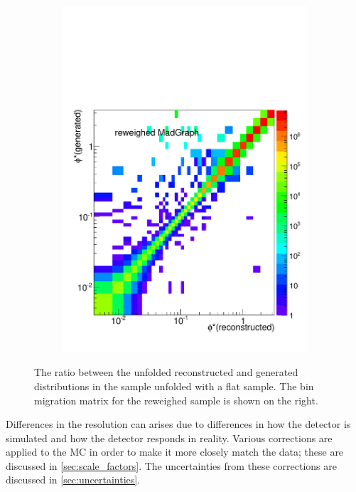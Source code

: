 \begin{figure}[!htbp]
\begin{subfigure}[b]{\SideBySidePlotWidth}
        \includegraphics[width=\textwidth]{figures/BinM_M_flat.pdf}
        \caption{}
        \label{fig:unfolding_flat_bin_migration}
    \end{subfigure}
    \caption[
        The ratio between the unfolded reconstructed and generated \phistar
        distributions in the \POWHEG sample unfolded with a flat \MADGRAPH
        sample.
    ]{
        The ratio between the unfolded reconstructed and generated \phistar
        distributions in the \POWHEG sample unfolded with a flat \MADGRAPH
        sample. The bin migration matrix for the reweighed \MADGRAPH sample is
        shown on the right.
    }
    \label{fig:flat_unfolding}
\end{figure}

Differences in the resolution can arises due to differences in how the
detector is simulated and how the detector responds in reality. Various
corrections are applied to the MC in order to make it more closely match the
data; these are discussed in \cref{sec:scale_factors}. The uncertainties
from these corrections are discussed in \cref{sec:uncertainties}.

